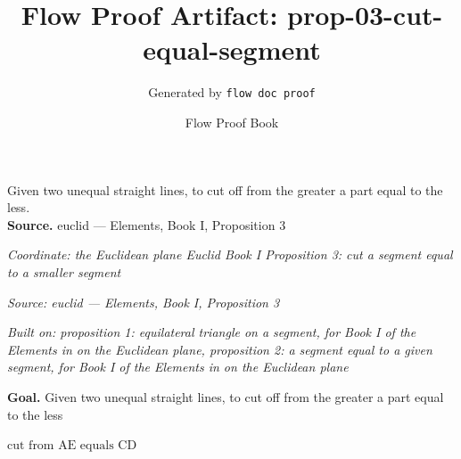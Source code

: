 \documentclass[11pt]{article}
\title{Flow Proof Artifact: prop-03-cut-equal-segment}
\author{Generated by \texttt{flow doc proof}}
\date{Flow Proof Book}
\theoremstyle{definition}
\begin{document}
\maketitle
Given two unequal straight lines, to cut off from the greater a part equal to the less.\\[0.5em]
\textbf{Source.} euclid — Elements, Book I, Proposition 3\\[0.5em]
\bigskip
{}\par
\smallskip\noindent\textit{Coordinate: the Euclidean plane \cdot Euclid Book I \cdot Proposition 3: cut a segment equal to a smaller segment}\par
\smallskip\noindent\textit{Source: euclid — Elements, Book I, Proposition 3}\par
\smallskip\noindent\textit{Built on: proposition 1: equilateral triangle on a segment, for Book I of the Elements in on the Euclidean plane, proposition 2: a segment equal to a given segment, for Book I of the Elements in on the Euclidean plane}\par
\medskip
\noindent\textbf{Goal.} Given two unequal straight lines, to cut off from the greater a part equal to the less\par
\noindent$\displaystyle \text{cut from AE equals CD}$\par
\medskip
\noindent
\end{document}

